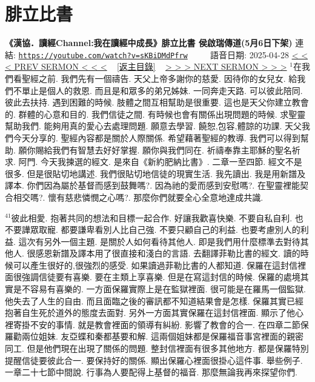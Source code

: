 \documentclass{book}
\begin{document}
\section{腓立比書}
\label{sec:sKBiDMdPfrw}
\textbf{《漢協．讀經Channel:我在讀經中成長》腓立比書 侯啟瑞傳道(5月6日下架)}
\newline
\newline
連結: \href{https://youtube.com/watch?v=sKBiDMdPfrw}{\texttt{https://youtube.com/watch?v=sKBiDMdPfrw}} ~~~~ 語音日期: 2025-04-28
\newline
\newline
\hyperref[sec:ToDbLeyWzNI]{\small{< < < PREV SERMON < < <}}
~
\hyperref[sec:index]{\small{[返主目錄]}}
~
\hyperref[sec:8MeYWz2C9Es]{\small{> > > NEXT SERMON > > >}}
\newline
\newline
$^{1}$在我們看聖經之前.
我們先有一個禱告.
天父上帝多謝你的慈愛.
因待你的女兒女.
給我們不單止是個人的救恩.
而且是和眾多的弟兄姊妹.
一同奔走天路.
可以彼此陪同.
彼此去扶持.
遇到困難的時候.
肢體之間互相幫助是很重要.
這也是天父你建立教會的.
群體的心意和目的.
我們信徒之間.
有時候也會有關係出現問題的時候.
求聖靈幫助我們.
能夠用真的愛心去處理問題.
願意去學習.
饒恕,包容,體諒的功課.
天父我們今天分享的.
聖經內容都是關於人際關係.
希望藉著聖經的教導.
我們可以得到幫助.
願你賜給我們有智慧去好好掌握.
願你與我們同在.
祈禱奉靠主耶穌的聖名祈求.
阿門.
今天我揀選的經文.
是來自《新約肥納比書》.
二章一至四節.
經文不是很多.
但是很貼切地講述.
我們很貼切地信徒的現實生活.
我先讀出.
我是用新譜及譯本.
你們因為屬於基督而感到鼓舞嗎?.
因為祂的愛而感到安慰嗎?.
在聖靈裡能契合相交嗎?.
懷有慈悲憐憫之心嗎?.
那麼你們就要全心全意地達成共識.

$^{41}$彼此相愛.
抱著共同的想法和目標一起合作.
好讓我歡喜快樂.
不要自私自利.
也不要譁眾取寵.
都要謙卑看別人比自己強.
不要只顧自己的利益.
也要考慮別人的利益.
這次有另外一個主題.
是關於人如何看待其他人.
即是我們用什麼標準去對待其他人.
很感恩新譜及譯本用了很直接和淺白的言語.
去翻譯菲勒比書的經文.
讀的時候可以產生很好的,很強烈的感受.
如果讀過菲勒比書的人都知道.
保羅在這封信裡面很強調信徒要有喜樂.
要在主類上享喜樂.
但是在寫這封信的時候.
保羅的處境其實是不容易有喜樂的.
一方面保羅實際上是在監獄裡面.
很可能是在羅馬一個監獄.
他失去了人生的自由.
而且面臨之後的審訊都不知道結果會是怎樣.
保羅其實已經抱著自生死於道外的態度去面對.
另外一方面其實保羅在這封信裡面.
顯示了他心裡寄掛不安的事情.
就是教會裡面的領導有糾紛.
影響了教會的合一.
在四章二節保羅勸兩位姐妹.
友亞蝶和秦都基要和解.
這兩個姐妹都是保羅福音事宮裡面的親密同工.
但是他們現在出現了關係的問題.
整封信裡面有很多其他地方.
都是保羅特別提醒信徒要彼此合一.
要保持好的關係.
顯出保羅心裡面很掛心這件事.
舉些例子.
一章二十七節中間說.
行事為人要配得上基督的福音.
那麼無論我再來探望你們.
\end{document}
